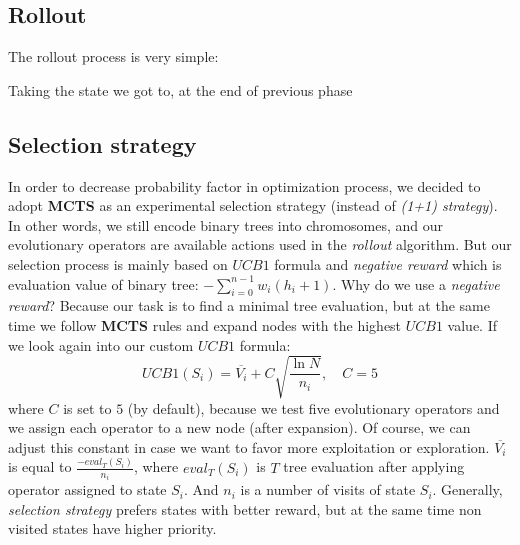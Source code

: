 \documentclass[12pt]{article}
\newcommand{\sumin}[2]{\sum\limits_{#1}^{#2}}
\begin{document}
\subsection{Rollout}
The rollout process is very simple:

\begin{algorithm}
\scriptsize
\caption{Taking the state we got to, at the end of previous phase}
\begin{algorithmic}[]

    \LOOP
    \ENDLOOP
\end{algorithmic}
\end{algorithm}

\subsection{Selection strategy}
In order to decrease probability factor in optimization process, we decided to adopt \textbf{MCTS} as an experimental selection strategy (instead of \textit{(1+1) strategy}).
In other words, we still encode binary trees into chromosomes, and our evolutionary operators are available actions used in the \textit{rollout} algorithm.
But our selection process is mainly based on $UCB1$ formula and \textit{negative reward} which is evaluation value of binary tree: $-\sumin{i=0}{n-1} w_i (h_i + 1)$.
Why do we use a \textit{negative reward}? Because our task is to find a minimal tree evaluation, but at the same time we follow \textbf{MCTS} rules and expand nodes with the highest $UCB1$ value.
If we look again into our custom $UCB1$ formula:
\[
    UCB1(S_i) = \overline{V_i} + C \sqrt{\frac{\ln{N}}{n_i}},\quad C=5
\]
where $C$ is set to $5$ (by default), because we test five evolutionary operators and we assign each operator to a new node (after expansion). Of course, we can adjust this constant in case we want to favor more exploitation or exploration.
$\overline{V_i}$ is equal to $\frac{-eval_{T}(S_i)}{n_i}$, where $eval_{T}(S_i)$ is $T$ tree evaluation after applying operator assigned to state $S_i$. And $n_i$ is a number of visits of state $S_i$.
Generally, \textit{selection strategy} prefers states with better reward, but at the same time non visited states have higher priority.
\end{document}
